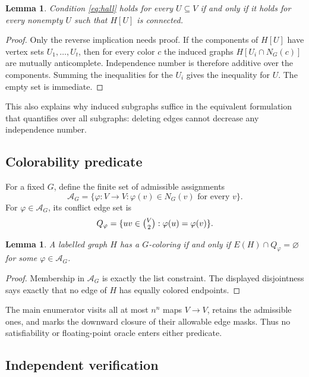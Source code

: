 \documentclass[11pt]{article}
\newtheorem{lemma}[theorem]{Lemma}
\newcommand{\cA}{\mathcal A}
\begin{document}
\begin{lemma}\label{lem:connected}
Condition \eqref{eq:hall} holds for every $U\subseteq V$ if and only if it
holds for every nonempty $U$ such that $H[U]$ is connected.
\end{lemma}

\begin{proof}
Only the reverse implication needs proof.  If the components of $H[U]$ have
vertex sets $U_1,\ldots,U_t$, then for every color $c$ the induced graphs
$H[U_i\cap N_G(c)]$ are mutually anticomplete.  Independence number is
therefore additive over the components.  Summing the inequalities for the
$U_i$ gives the inequality for $U$.  The empty set is immediate.
\end{proof}

This also explains why induced subgraphs suffice in the equivalent formulation
that quantifies over all subgraphs: deleting edges cannot decrease any
independence number.

\subsection{Colorability predicate}

For a fixed $G$, define the finite set of admissible assignments
\[
  \cA_G=\{\varphi:V\to V:\varphi(v)\in N_G(v)\text{ for every }v\}.
\]
For $\varphi\in\cA_G$, its conflict edge set is
\[
  Q_\varphi=\{uv\in\tbinom V2:\varphi(u)=\varphi(v)\}.
\]

\begin{lemma}\label{lem:conflict}
A labelled graph $H$ has a $G$-coloring if and only if
$E(H)\cap Q_\varphi=\varnothing$ for some $\varphi\in\cA_G$.
\end{lemma}

\begin{proof}
Membership in $\cA_G$ is exactly the list constraint.  The displayed
disjointness says exactly that no edge of $H$ has equally colored endpoints.
\end{proof}

The main enumerator visits all at most $n^n$ maps $V\to V$, retains the
admissible ones, and marks the downward closure of their allowable edge masks.
Thus no satisfiability or floating-point oracle enters either predicate.

\subsection{Independent verification}
\end{document}
